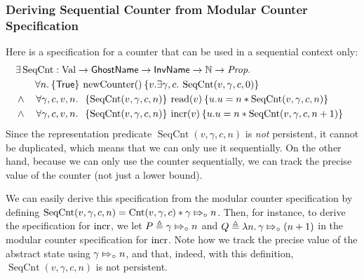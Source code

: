 \subsubsection{Deriving Sequential Counter from Modular Counter Specification}
\label{sec:deriving-sequential-from-modular-conter}

\newcommand{\SeqCnt}{\operatorname{SeqCnt}}

Here is a specification for a counter that can be used in a sequential context only:
\begin{align*}
  & \Exists \SeqCnt : \Val \to \textlog{GhostName} \to \textlog{InvName} \to \nat \to \Prop.\\
  & \qquad\All n. \hoare{\TRUE}{\newC()}{v.\Exists \gamma, c.  \SeqCnt(v,\gamma,c,0)}  \\
  & \land \quad\All \gamma, c, v, n.
    \begin{array}[t]{l}
      \hoare{\SeqCnt(v,\gamma, c, n)}{\readC(v)}{u. u = n \ast \SeqCnt(v,\gamma, c, n)}
    \end{array}\\
  & \land \quad\All \gamma, c, v, n.
    \begin{array}[t]{l}
      \hoare{\SeqCnt(v,\gamma,c, n)}{\incrC(v)}{u. u = n \ast \SeqCnt(v,\gamma,c,n+1)}
    \end{array}\\
\end{align*}
Since the representation predicate
$\SeqCnt(v,\gamma,c,n)$ is \emph{not} persistent, it cannot be duplicated, which means that we can only use it
sequentially. On the other hand, because we can only use the counter sequentially, we can track the precise
value of the counter (not just a lower bound). 

We can easily derive this specification from the modular counter specification by defining
$\SeqCnt(v,\gamma,c,n) = \Cnt(v,\gamma,c) \ast \abstractstatefullfrag{\gamma}{n}$.
Then, for instance, to derive the specification for $\operatorname{incr}$, we let $P \triangleq \gamma \Mapsto_{\circ} n$
and $Q \triangleq \lambda n.\, \gamma \Mapsto_{\circ} (n+1)$ in the modular counter specification for $\operatorname{incr}$.
Note how we track the precise value of the abstract state using $\gamma \Mapsto_{\circ} n$,
and that, indeed, with this definition, $\SeqCnt(v,\gamma,c,n)$ is not persistent.

